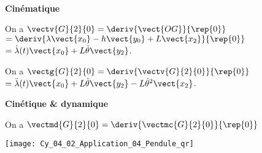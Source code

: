 \ifprof
\begin{corrige}
~\\

\textbf{Cinématique}

On a $\vectv{G}{2}{0}=\deriv{\vect{OG}}{\rep{0}} $ 
$=\deriv{\lambda\vect{x_0}-h\vect{y_0}+L\vect{x_2}}{\rep{0}}$ 
$=\dot{\lambda}(t)\vect{x_0}+L\dot{\theta}\vect{y_2}$.



On a $\vectg{G}{2}{0}=\deriv{\vectv{G}{2}{0}}{\rep{0}} $ 
$=\ddot{\lambda}(t)\vect{x_0}+L\ddot{\theta}\vect{y_2}-L\dot{\theta}^2\vect{x_2}$.

\textbf{Cinétique \& dynamique}


On a $\vectmd{G}{2}{0} = \deriv{\vectmc{G}{2}{0}}{\rep{0}} $
\end{corrige}
\else
\fi



\ifprof
\begin{corrige}
\end{corrige}
\else
\fi


\ifprof
\begin{corrige}
\end{corrige}
\else
\fi


\ifprof
\else
\begin{marginfigure}
\centering
\texttt{[image: Cy\_04\_02\_Application\_04\_Pendule\_qr]}
\end{marginfigure}
\fi

\ifprof
\begin{corrige}
\end{corrige}
\else
\fi

